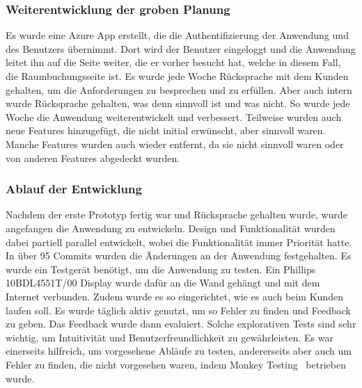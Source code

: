\subsubsection{Weiterentwicklung der groben Planung}
Es wurde eine Azure App erstellt, die die Authentifizierung der Anwendung und des Benutzers übernimmt.
\newline
Dort wird der Benutzer eingeloggt und die Anwendung leitet ihn auf die Seite weiter, die er vorher besucht hat, welche in diesem Fall, die Raumbuchungsseite ist.
\newline
Es wurde jede Woche Rücksprache mit dem Kunden gehalten, um die Anforderungen zu besprechen und zu erfüllen.
Aber auch intern wurde Rücksprache gehalten, was denn sinnvoll ist und was nicht.
\newline
So wurde jede Woche die Anwendung weiterentwickelt und verbessert.
Teilweise wurden auch neue Features hinzugefügt, die nicht initial erwünscht, aber sinnvoll waren.
Manche Features wurden auch wieder entfernt, da sie nicht sinnvoll waren oder von anderen Features abgedeckt wurden.
\newline
\newline
\subsubsection{Ablauf der Entwicklung}
Nachdem der erste Prototyp fertig war und Rücksprache gehalten wurde, wurde angefangen die Anwendung zu entwickeln.
Design und Funktionalität wurden dabei partiell parallel entwickelt, wobei die Funktionalität immer Priorität hatte.
In über 95 Commits wurden die Änderungen an der Anwendung festgehalten.
\newline
Es wurde ein Testgerät benötigt, um die Anwendung zu testen.
Ein Phillips 10BDL4551T/00 Display wurde dafür an die Wand gehängt und mit dem Internet verbunden.
Zudem wurde es so eingerichtet, wie es auch beim Kunden laufen soll.
\newline
Es wurde täglich aktiv genutzt, um so Fehler zu finden und Feedback zu geben.
Das Feedback wurde dann evaluiert.
Solche explorativen Tests sind sehr wichtig, um Intuitivität und Benutzerfreundlichkeit zu gewährleisten.
Es war einerseits hilfreich, um vorgesehene Abläufe zu testen, andererseits aber auch um Fehler zu finden, die nicht vorgesehen waren, indem Monkey Testing~\cite{Monkey-Testing-Book1} betrieben wurde.
\newline
